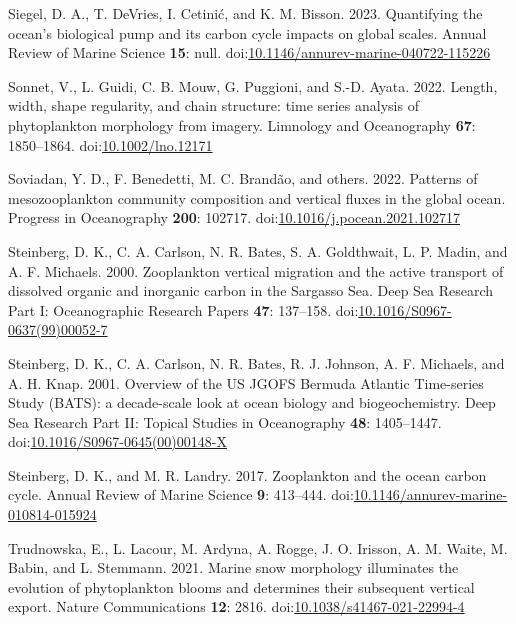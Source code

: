 \documentclass[
]{article}
\newlength{\cslhangindent}
\newlength{\cslentryspacingunit} %
\newenvironment{CSLReferences}[2] %
 {%
  \setlength{\parindent}{0pt}
  \ifodd #1
  \let\oldpar\par
  \def\par{\hangindent=\cslhangindent\oldpar}
  \fi
  \setlength{\parskip}{#2\cslentryspacingunit}
 }%
 {}
\begin{document}
\begin{CSLReferences}{1}{0}
\leavevmode{}%
Siegel, D. A., T. DeVries, I. Cetinić, and K. M. Bisson. 2023.
Quantifying the ocean's biological pump and its carbon cycle impacts on
global scales. Annual Review of Marine Science \textbf{15}: null.
doi:\href{https://doi.org/10.1146/annurev-marine-040722-115226}{10.1146/annurev-marine-040722-115226}

\leavevmode{}%
Sonnet, V., L. Guidi, C. B. Mouw, G. Puggioni, and S.-D. Ayata. 2022.
Length, width, shape regularity, and chain structure: time series
analysis of phytoplankton morphology from imagery. Limnology and
Oceanography \textbf{67}: 1850--1864.
doi:\href{https://doi.org/10.1002/lno.12171}{10.1002/lno.12171}

\leavevmode{}%
Soviadan, Y. D., F. Benedetti, M. C. Brandão, and others. 2022. Patterns
of mesozooplankton community composition and vertical fluxes in the
global ocean. Progress in Oceanography \textbf{200}: 102717.
doi:\href{https://doi.org/10.1016/j.pocean.2021.102717}{10.1016/j.pocean.2021.102717}

\leavevmode{}%
Steinberg, D. K., C. A. Carlson, N. R. Bates, S. A. Goldthwait, L. P.
Madin, and A. F. Michaels. 2000. Zooplankton vertical migration and the
active transport of dissolved organic and inorganic carbon in the
Sargasso Sea. Deep Sea Research Part I: Oceanographic Research Papers
\textbf{47}: 137--158.
doi:\href{https://doi.org/10.1016/S0967-0637(99)00052-7}{10.1016/S0967-0637(99)00052-7}

\leavevmode{}%
Steinberg, D. K., C. A. Carlson, N. R. Bates, R. J. Johnson, A. F.
Michaels, and A. H. Knap. 2001. Overview of the US JGOFS Bermuda
Atlantic Time-series Study (BATS): a decade-scale look at ocean biology
and biogeochemistry. Deep Sea Research Part II: Topical Studies in
Oceanography \textbf{48}: 1405--1447.
doi:\href{https://doi.org/10.1016/S0967-0645(00)00148-X}{10.1016/S0967-0645(00)00148-X}

\leavevmode{}%
Steinberg, D. K., and M. R. Landry. 2017. Zooplankton and the ocean
carbon cycle. Annual Review of Marine Science \textbf{9}: 413--444.
doi:\href{https://doi.org/10.1146/annurev-marine-010814-015924}{10.1146/annurev-marine-010814-015924}

\leavevmode{}%
Trudnowska, E., L. Lacour, M. Ardyna, A. Rogge, J. O. Irisson, A. M.
Waite, M. Babin, and L. Stemmann. 2021. Marine snow morphology
illuminates the evolution of phytoplankton blooms and determines their
subsequent vertical export. Nature Communications \textbf{12}: 2816.
doi:\href{https://doi.org/10.1038/s41467-021-22994-4}{10.1038/s41467-021-22994-4}


\end{CSLReferences}
\end{document}
